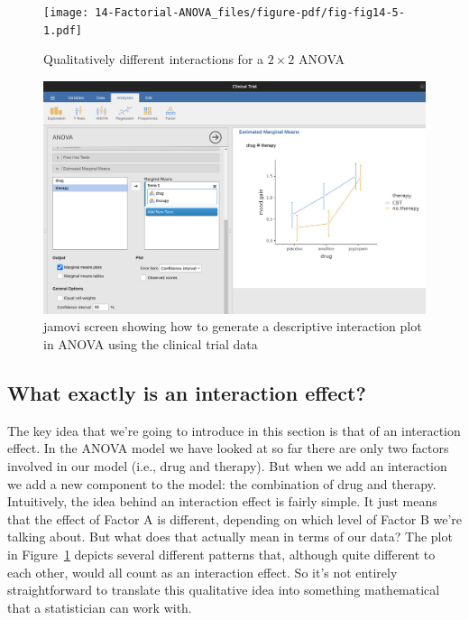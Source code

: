 \documentclass[
  a4paper,
]{book}
\begin{document}
\begin{figure}

\texttt{[image: 14-Factorial-ANOVA\_files/figure-pdf/fig-fig14-5-1.pdf]} \hfill{}

\caption{\label{fig-fig14-5}Qualitatively different interactions for a
\(2 \times 2\) ANOVA}

\end{figure}

\begin{figure}

\includegraphics[width=1\textwidth,height=\textheight]{images/fig14-6.png} \hfill{}

\caption{\label{fig-fig14-6}jamovi screen showing how to generate a
descriptive interaction plot in ANOVA using the clinical trial data}

\end{figure}

\hypertarget{what-exactly-is-an-interaction-effect}{%
\subsection{What exactly is an interaction
effect?}\label{what-exactly-is-an-interaction-effect}}

The key idea that we're going to introduce in this section is that of an
interaction effect. In the ANOVA model we have looked at so far there
are only two factors involved in our model (i.e., drug and therapy). But
when we add an interaction we add a new component to the model: the
combination of drug and therapy. Intuitively, the idea behind an
interaction effect is fairly simple. It just means that the effect of
Factor A is different, depending on which level of Factor B we're
talking about. But what does that actually mean in terms of our data?
The plot in Figure~\ref{fig-fig14-5} depicts several different patterns
that, although quite different to each other, would all count as an
interaction effect. So it's not entirely straightforward to translate
this qualitative idea into something mathematical that a statistician
can work with.
\end{document}
